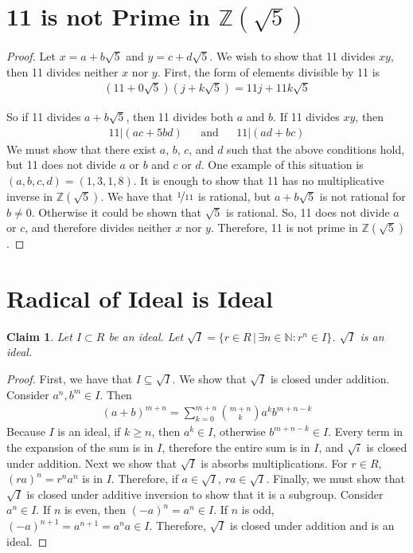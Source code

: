 \documentclass[12pt]{article}
\newtheorem*{claim*}{Claim}
\begin{document}
\section{11 is not Prime in $\mathbb{Z}(\sqrt{5})$}
\begin{proof}
Let $x = a + b\sqrt{5}$ and $y = c + d\sqrt{5}$. We wish to show that 11 divides $xy$, then 11 divides neither $x$ nor $y$. First, the form of elements divisible by 11 is
\begin{align*}
(11 + 0\sqrt{5})(j + k\sqrt{5}) = 11j + 11k\sqrt{5}
\end{align*}

So if 11 divides $a + b\sqrt{5}$, then 11 divides both $a$ and $b$. If 11 divides $xy$, then
\begin{align*}
11 | (ac + 5bd) & &\text{and}& & 11 | (ad + bc)
\end{align*}
We must show that there exist $a$, $b$, $c$, and $d$ such that the above conditions hold, but 11 does not divide $a$ or $b$ and $c$ or $d$. One example of this situation is $(a, b, c, d) = (1,3,1,8)$.
It is enough to show that 11 has no multiplicative inverse in $\mathbb{Z}(\sqrt{5})$. We have that $\nicefrac{1}{11}$ is rational, but $a + b\sqrt{5}$ is not rational for $b \neq 0$. Otherwise it could be shown that $\sqrt{5}$ is rational. So, 11 does not divide $a$ or $c$, and therefore divides neither $x$ nor $y$. Therefore, 11 is not prime in $\mathbb{Z}(\sqrt{5})$.
\end{proof}

\section{Radical of Ideal is Ideal}
\begin{claim*}
Let $I \subset R$ be an ideal. Let $\sqrt{I} = \{r \in R \, | \, \exists n \in \mathbb{N} : r^n \in I\}$. $\sqrt{I}$ is an ideal.
\end{claim*}
\begin{proof}
First, we have that $I \subseteq \sqrt{I}$. We show that $\sqrt{I}$ is closed under addition. Consider $a^n, b^m \in I$. Then
\begin{align*}
(a + b) ^ {m + n} = \sum_{k = 0} ^{m + n} \binom{m + n}{k} a^k b^{m + n - k}
\end{align*}
Because $I$ is an ideal, if $k \geq n$, then $a^k \in I$, otherwise $b ^ {m + n - k} \in I$. Every term in the expansion of the sum is in $I$, therefore the entire sum is in $I$, and $\sqrt{i}$ is closed under addition. Next we show that $\sqrt{I}$ is absorbs multiplications. For $r \in R$, $(ra)^n = r^n a^n$ is in $I$. Therefore, if $a \in \sqrt{I}$, $ra \in \sqrt{I}$. Finally, we must show that $\sqrt{I}$ is closed under additive inversion to show that it is a subgroup. Consider $a^n \in I$. If $n$ is even, then $(-a)^n = a^n \in I$. If $n$ is odd, $(-a)^{n + 1} = a^{n + 1} = a^n a \in I$. Therefore, $\sqrt{I}$ is closed under addition and is an ideal.
\end{proof}
\end{document}
